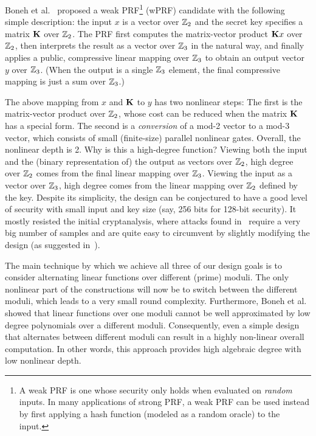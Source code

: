 Boneh et al.~\cite{boneh2018-darkmatter} proposed a weak PRF\footnote{A weak PRF is one whose security only holds when evaluated on {\em random} inputs. In many applications of strong PRF, a weak PRF can be used instead by first applying a hash function (modeled as a random oracle) to the input.} (wPRF) candidate with the following simple description: the input $x$ is a vector over  $\mathbb{Z}_2$ and the secret key specifies a matrix $\mat{K}$ over  $\mathbb{Z}_2$. The PRF first computes the matrix-vector product $\mat{K}x$ over  $\mathbb{Z}_2$, then interprets the result as a vector over $\mathbb{Z}_3$ in the natural way,  and finally applies a public, compressive linear mapping over $\mathbb{Z}_3$ to obtain an output vector $y$ over $\mathbb{Z}_3$. (When the output is a single $\mathbb{Z}_3$ element, the final compressive mapping is just a sum over $\mathbb{Z}_3$.)

The above mapping from $x$ and $\mat K$ to $y$ has two nonlinear steps: The first is the matrix-vector product over $\mathbb{Z}_2$, whose cost can be reduced when the matrix $\mat K$ has a special form. The second is a {\em conversion} of a mod-2 vector to a mod-3 vector, which consists of small  (finite-size) parallel nonlinear gates.  Overall, the nonlinear depth is 2. Why is this a high-degree function? Viewing both the input and the (binary representation of) the output as vectors over $\mathbb{Z}_2$, high degree over $\mathbb{Z}_2$ comes from the final linear mapping over $\mathbb{Z}_3$. Viewing the input as a vector over $\mathbb{Z}_3$, high degree comes from the linear mapping over $\mathbb{Z}_2$ defined by the key.  Despite its simplicity, the design can be conjectured to have a good level of security with small input and key size (say, 256 bits for 128-bit security). It mostly resisted the initial cryptanalysis, where attacks found in~\cite{cheon2020-adventures} require a very big number of samples and are quite easy to circumvent by slightly modifying the design (as suggested in~\cite{cheon2020-adventures}).

\iffalse
The main technique by which we achieve all three of our design goals is to consider alternating linear functions over different (prime) moduli. The only nonlinear part of the constructions will now be to switch between the different moduli, which leads to a very small round complexity. Furthermore, Boneh et al.~\cite{boneh2018-darkmatter} showed that linear functions over one moduli cannot be well approximated by low degree polynomials over a different moduli. Consequently, even a simple design that alternates between different moduli can result in a highly non-linear overall computation. In other words, this approach provides high algebraic degree with low nonlinear depth.

